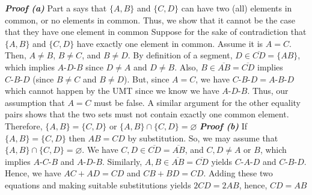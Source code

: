 \documentclass{report}
\begin{document}
\begin{itemize}
            \textbf{\textit{Proof (a)}} Part a says that $\{A,B\}$ and $\{C,D\}$ can have two (all) elements in common, or no elements in common. Thus, we show that it cannot be the case that they have one element in common
            \bigbreak \noindent 
            Suppose for the sake of contradiction that $\{A,B\}$ and $\{C,D\}$ have exactly one element in common. Assume it is $A=C$. Then, $A \ne B$, $B\ne C$, and $B \ne D$. 
            \bigbreak \noindent 
            By definition of a segment, $D \in \overline{CD} = \{AB\}$, which implies $A\text{-}D\text{-}B$ since $D\ne A$ and $D \ne B$. Also, $B \in  \overline{AB} = \overline{CD}$ implies $C\text{-}B\text{-} D$ (since $B \ne C$ and $B \ne D$). But, since $A = C$, we have $C\text{-}B\text{-}D  = A\text{-}B\text{-}D$ which cannot happen by the UMT since we know we have $A\text{-}D\text{-}B $. Thus, our assumption that $A = C$ must be false. A similar argument for the other equality pairs shows that the two sets must not contain exactly one common element.
            \bigbreak \noindent 
            Therefore, $\{A,B\} = \{C,D\}$ or $\{A,B\} \cap \{C,D\} = \varnothing$
            \bigbreak \noindent 
            \textbf{\textit{Proof (b)}} If $\{A,B\} = \{C,D\} $ then $AB = CD$ by substitution. So, we may assume that $\{A,B\} \cap \{C,D\} = \varnothing$. 
            \bigbreak \noindent 
            We have $C,D \in \overline{CD} = \overline{AB}$, and $C,D \ne A \text{ or } B$, which implies $A\text{-}C\text{-} B$ and $A\text{-}D\text{-}B$. Similarly, $A,B \in \overline{AB} = \overline{CD} $ yields $C\text{-}A\text{-}D$ and $C\text{-}B\text{-}D$. Hence, we have $AC + AD = CD$ and $CB +BD = CD$. Adding these two equations and making suitable substitutions  yields $2CD = 2AB$, hence, $CD = AB$
            \endpf

    \end{itemize}

    \pagebreak 
\end{document}
